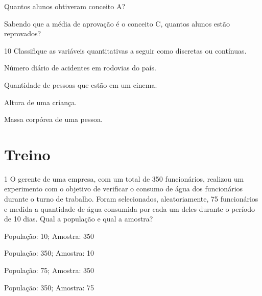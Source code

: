 \begin{escolha}
\item
  Quantos alunos obtiveram conceito A?\\

\item
  Sabendo que a média de aprovação é o conceito C, quantos alunos estão
  reprovados?\\
\end{escolha}

\num{10} Classifique as variáveis quantitativas a seguir como discretas
ou contínuas.


\begin{escolha}
\item
  Número diário de acidentes em rodovias do país.\\

\item
  Quantidade de pessoas que estão em um cinema.\\

\item
  Altura de uma criança.\\

\item
  Massa corpórea de uma pessoa.\\
\end{escolha}

\section*{Treino}

\num{1} O gerente de uma empresa, com um total de 350 funcionários,
realizou um experimento com o objetivo de verificar o consumo de água
dos funcionários durante o turno de trabalho. Foram selecionados,
aleatoriamente, 75 funcionários e medida a quantidade de água consumida
por cada um deles durante o período de 10 dias. Qual a população e qual
a amostra?

\begin{minipage}{.5\textwidth}
\begin{escolha}
\item
  População: 10; Amostra: 350
\item
  População: 350; Amostra: 10
\item
  População: 75; Amostra: 350
\item
  População: 350; Amostra: 75
\end{escolha}
\end{minipage}


